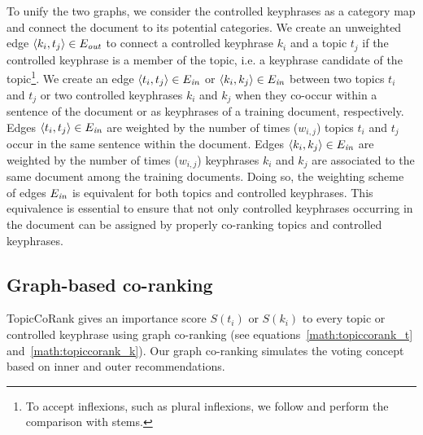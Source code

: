         To unify the two graphs, we consider the controlled keyphrases as a category map and connect the document to its potential categories.
        We create an unweighted edge $\langle{}k_i, t_j\rangle{} \in E_{\textnormal{\textit{out}}}$ to connect a controlled keyphrase $k_i$ and a topic $t_j$ if the controlled keyphrase is a member of the topic, i.e. a keyphrase candidate of the topic\footnote{To accept inflexions, such as plural inflexions, we follow  and perform the comparison with stems.}.
        We create an edge $\langle{}t_i, t_j\rangle{} \in E_\textnormal{\textit{in}}$ or $\langle{}k_i, k_j\rangle{} \in E_\textnormal{\textit{in}}$ between two topics $t_i$ and $t_j$ or two controlled keyphrases $k_i$ and $k_j$ when they co-occur within a sentence of the document or as keyphrases of a training document, respectively.
        Edges $\langle{}t_i, t_j\rangle{} \in E_{\textnormal{\textit{in}}}$ are weighted by the number of times ($w_{i, j}$) topics $t_i$ and $t_j$ occur in the same sentence within the document.
        Edges $\langle{}k_i, k_j\rangle{} \in E_{\textnormal{\textit{in}}}$ are weighted by the number of times ($w_{i, j}$) keyphrases $k_i$ and $k_j$ are associated to the same document among the training documents.
        Doing so, the weighting scheme of edges $E_\textnormal{\textit{in}}$ is equivalent for both topics and controlled keyphrases.
        This equivalence is essential to ensure that not only controlled keyphrases occurring in the document can be assigned by properly co-ranking topics and controlled keyphrases.

    \subsection{Graph-based co-ranking}
    \label{subsec:graph_based_co_ranking}
        TopicCoRank gives an importance score $S(t_i)$ or $S(k_i)$ to every topic or controlled keyphrase using graph co-ranking (see equations~\ref{math:topiccorank_t} and~\ref{math:topiccorank_k}).
        Our graph co-ranking simulates the voting concept based on inner and outer recommendations.
        
